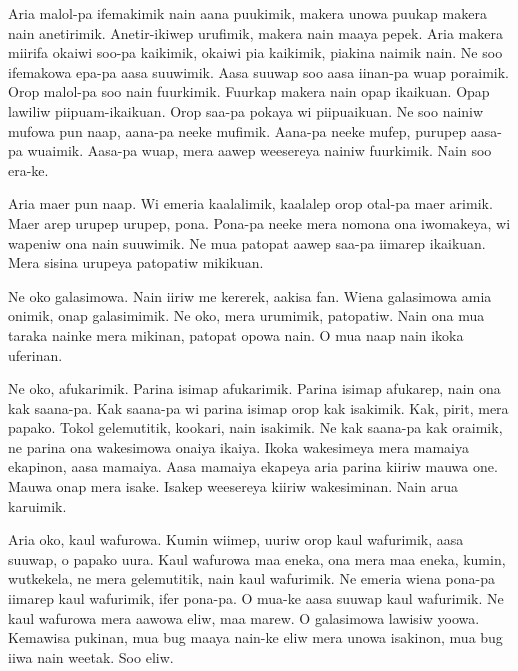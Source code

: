Aria  malol-pa  ifemakimik  nain  aana puukimik,  makera  unowa  puukap makera  nain  anetirimik. 
Anetir-ikiwep  urufimik,  makera  nain  maaya  pepek. 
Aria  makera  miirifa  okaiwi  soo-pa  kaikimik, okaiwi  pia  kaikimik,  piakina  naimik  nain. 
Ne  soo  ifemakowa  epa-pa  aasa  suuwimik. 
Aasa  suuwap  soo  aasa  iinan-pa  wuap poraimik. 
Orop  malol-pa  soo  nain  fuurkimik. 
Fuurkap  makera  nain  opap  ikaikuan. 
Opap  lawiliw  piipuam-ikaikuan. 
Orop  saa-pa  pokaya  wi  piipuaikuan. 
Ne  soo  nainiw  mufowa  pun  naap,  aana-pa  neeke  mufimik. 
Aana-pa  neeke  mufep,  purupep  aasa-pa  wuaimik. 
Aasa-pa  wuap,  mera  aawep  weesereya  nainiw  fuurkimik. 
Nain  soo  era-ke. 

Aria  maer  pun  naap. 
Wi  emeria  kaalalimik,  kaalalep   orop  otal-pa  maer  arimik. 
Maer  arep  urupep  urupep,  pona. 
Pona-pa  neeke  mera  nomona  ona  iwomakeya, wi  wapeniw  ona  nain  suuwimik. 
Ne  mua  patopat  aawep  saa-pa  iimarep ikaikuan. 
Mera  sisina  urupeya  patopatiw  mikikuan.

Ne  oko  galasimowa. 
Nain  iiriw  me  kererek,  aakisa  fan. 
Wiena  galasimowa  amia  onimik, onap  galasimimik. 
Ne  oko,  mera  urumimik,  patopatiw. 
Nain  ona  mua  taraka  nainke  mera  mikinan, patopat  opowa  nain. 
O  mua  naap  nain  ikoka  uferinan. 

Ne  oko,  afukarimik. 
Parina  isimap  afukarimik. 
Parina  isimap  afukarep,  nain ona  kak  saana-pa. 
Kak  saana-pa  wi  parina  isimap orop  kak  isakimik. 
Kak,  pirit,  mera  papako. 
Tokol  gelemutitik,  kookari,  nain  isakimik. 
Ne  kak  saana-pa  kak  oraimik,  ne  parina  ona  wakesimowa  onaiya  ikaiya. 
Ikoka  wakesimeya  mera  mamaiya  ekapinon,  aasa  mamaiya. 
Aasa  mamaiya  ekapeya  aria  parina  kiiriw    mauwa  one. 
Mauwa  onap  mera  isake. 
Isakep  weesereya  kiiriw  wakesiminan. 
Nain  arua  karuimik. 

Aria  oko,  kaul  wafurowa. 
Kumin  wiimep,  uuriw  orop  kaul wafurimik,  aasa  suuwap,  o  papako  uura. 
Kaul  wafurowa  maa  eneka,  ona  mera  maa  eneka,   kumin,  wutkekela,  ne  mera  gelemutitik, nain  kaul  wafurimik. 
Ne  emeria  wiena  pona-pa  iimarep  kaul  wafurimik,  ifer  pona-pa. 
O  mua-ke  aasa  suuwap  kaul  wafurimik. 
Ne  kaul  wafurowa  mera  aawowa  eliw,  maa  marew. 
O  galasimowa  lawisiw  yoowa. 
Kemawisa  pukinan,  mua  bug  maaya  nain-ke  eliw  mera  unowa  isakinon,  mua  bug  iiwa  nain  weetak. 
Soo  eliw. 



